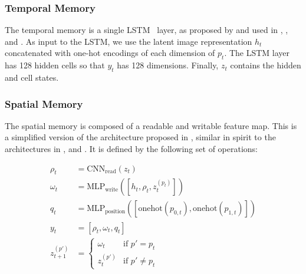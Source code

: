 \subsubsection{Temporal Memory}

The temporal memory is a single LSTM~\cite{hochreiter_schmidhuber_lstm_1997} layer, as proposed by \cite{hausknecht_stone_2017} and used in \cite{mnih_asynchronous_2016}, \cite{mirowski_navigate_2017}, and \cite{gupta_cognitive_2019}.
As input to the LSTM, we use the latent image representation \(h_t\) concatenated with one-hot encodings of each dimension of \(p_t\).
The LSTM layer has 128 hidden cells so that \(y_t\) has 128 dimensions.
Finally, \(z_t\) contains the hidden and cell states.

\subsubsection{Spatial Memory}

The spatial memory is composed of a readable and writable feature map.
This is a simplified version of the architecture proposed in \cite{parisotto_salakhutdinov_2017}, similar in spirit to the architectures in \cite{henriques_vedaldi_2018}, \cite{gupta_cognitive_2019} and \cite{chaplot_semantic_2020}.
It is defined by the following set of operations:

\begin{align}
    \rho_t &= \text{CNN}_\text{read}(z_t) \\
    \omega_t &= \text{MLP}_\text{write}(\left\lbrack h_t, \rho_t, z_t^{(p_t)} \right\rbrack) \\
    q_t &= \text{MLP}_\text{position}(\left\lbrack \text{onehot}(p_{0,t}), \text{onehot}(p_{1,t}) \right\rbrack) \\
    y_t &= \left\lbrack \rho_t, \omega_t, q_t \right\rbrack \\
    z_{t+1}^{(p')} &=
    \begin{cases}
        \omega_t & \text{if } p' = p_t \\
        z_{t}^{(p')} & \text{if } p' \neq p_t
    \end{cases}
\end{align}

